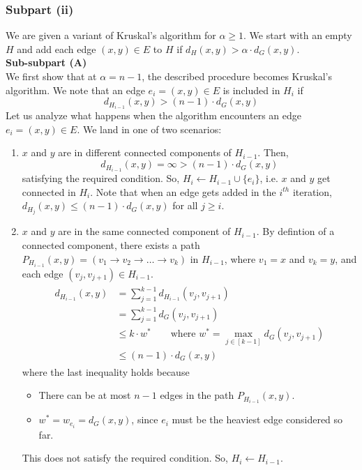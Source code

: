 \documentclass[9pt]{article}
\begin{document}
\subsubsection*{Subpart (ii)}
We are given a variant of Kruskal's algorithm for $\alpha \geq 1$. We start with an empty $H$
and add each edge $(x, y) \in E$ to $H$ if $d_{H}(x, y) > \alpha \cdot d_{G}(x, y)$.
\vspace*{10pt} \\
\textbf{Sub-subpart (A)}
\vspace*{5pt} \\
We first show that at $\alpha = n - 1$, the described procedure becomes Kruskal's algorithm.
We note that an edge $e_{i} = (x, y) \in E$ is included in $H_{i}$ if
\begin{equation}
    d_{H_{i-1}}(x, y) > (n - 1) \cdot d_{G}(x, y)
\end{equation}
Let us analyze what happens when the algorithm encounters an edge $e_{i} = (x, y) \in E$.
We land in one of two scenarios:
\begin{enumerate}
    \item $x$ and $y$ are in different connected components of $H_{i-1}$. Then,
    \begin{equation}
        d_{H_{i-1}}(x, y) = \infty > (n - 1) \cdot d_{G}(x, y)
    \end{equation}
    satisfying the required condition. So, $H_{i} \gets H_{i-1} \cup \{ e_{i} \}$, i.e. $x$ and
    $y$ get connected in $H_{i}$. Note that when an edge gets added in the $i^{th}$ iteration,
    $d_{H_{j}}(x, y) \leq (n - 1) \cdot d_{G}(x, y)$ for all $j \geq i$.
    \item $x$ and $y$ are in the same connected component of $H_{i-1}$. By defintion of a connected
    component, there exists a path $P_{H_{i-1}}(x, y) = (v_{1} \to v_{2} \to \ldots \to v_{k})$
    in $H_{i-1}$, where $v_{1} = x$ and $v_{k} = y$, and each edge $(v_{j}, v_{j+1}) \in H_{i-1}$.
    \begin{align}
        \begin{split}
            d_{H_{i-1}}(x, y) &= \sum_{j=1}^{k-1} d_{H_{i-1}}(v_{j}, v_{j+1}) \\
            &= \sum_{j=1}^{k-1} d_{G}(v_{j}, v_{j+1}) \\
            &\leq k \cdot w^{*} \qquad \text{where } w^{*} = \max_{j \in [k-1]} d_{G}(v_{j}, v_{j+1}) \\
            &\leq (n - 1) \cdot d_{G}(x, y)
        \end{split}
    \end{align}
    where the last inequality holds because
    \begin{itemize}
        \item There can be at most $n - 1$ edges in the path $P_{H_{i-1}}(x, y)$.
        \item $w^{*} = w_{e_{i}} = d_{G}(x, y)$, since $e_{i}$ must be the heaviest edge
        considered so far.
    \end{itemize}
    This does not satisfy the required condition. So, $H_{i} \gets H_{i-1}$.
\end{enumerate}
\end{document}
